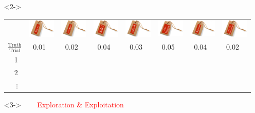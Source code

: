\documentclass[xcolor={dvipsnames}]{beamer}
\begin{document}
{\setlength{\leftmargini}{-15pt}
\begin{itemize}
\item[]<2->
\setlength\tabcolsep{-1pt}
\begin{tabular}{r|lllllll}
&\includegraphics[height=.425in]{stuff/p6.png}
&\includegraphics[height=.425in]{stuff/p5.png}
&\includegraphics[height=.425in]{stuff/p1.png}
&\includegraphics[height=.425in]{stuff/p2.png}
&\includegraphics[height=.425in]{stuff/p4.png}
&\includegraphics[height=.425in]{stuff/p3.png}
&\includegraphics[height=.425in]{stuff/p7.png}\\
$\frac{\text{Truth}}{\text{Trial}}$ & $\;\;$0.01 & $\;\;$0.02 & $\;\;$0.04 & $\;\;$0.03 & $\;\;$0.05 & $\;\;$0.04 & $\;\;$0.02\\ \hline
 1$\;\;$ &  & \\ 
2$\;\;$ &  &  \\ 
$\vdots\;\;$ & \\ 
\end{tabular}

\item[]<3->
\vspace{-.5in}
\Huge
$\quad\;\;$ \textcolor{red}{Exploration \& Exploitation}
\end{itemize}

}
\end{document}
